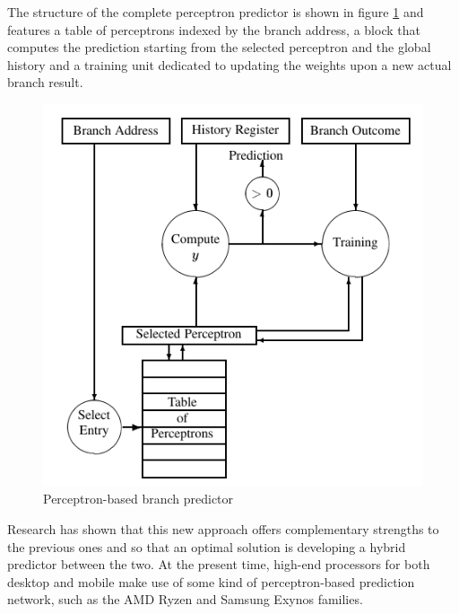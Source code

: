 The structure of the complete perceptron predictor is shown in figure \ref{fig:perceptron-bp} and features a table of perceptrons indexed by the branch address, a block that computes the prediction starting from the selected perceptron and the global history and a training unit dedicated to updating the weights upon a new actual branch result.
\begin{figure}[hbt]
  \centering
  \includegraphics[width=.8\textwidth]{img/perceptron-bp.pdf}
  \caption{Perceptron-based branch predictor}
  \label{fig:perceptron-bp}
\end{figure}

Research \cite{jimenez01} has shown that this new approach offers complementary strengths to the previous ones and so that an optimal solution is developing a hybrid predictor between the two. At the present time, high-end processors for both desktop and mobile make use of some kind of perceptron-based prediction network, such as the AMD Ryzen and Samsung Exynos families.